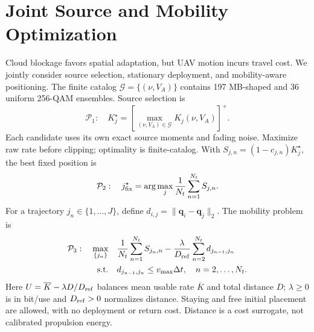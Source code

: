 \raggedbottom
\section{Joint Source and Mobility Optimization}
\label{sec:optimization}
Cloud blockage favors spatial adaptation, but UAV motion incurs travel
cost. We jointly consider source selection, stationary deployment, and
mobility-aware positioning.
The finite catalog $\mathcal G=\{(\nu,V_A)\}$ contains 197 MB-shaped and
36 uniform 256-QAM ensembles. Source selection is
\begin{equation}
 \mathcal P_1:\quad K_j^\star=
 \left[\max_{(\nu,V_A)\in\mathcal G}K_j(\nu,V_A)\right]^+.
 \label{eq:p1}
\end{equation}
Each candidate uses its own exact source moments and fading noise.
Maximize raw rate before clipping; optimality is finite-catalog.
With $S_{j,n}=(1-c_{j,n})K_j^\star$, the best fixed position is
\begin{equation}
 \mathcal P_2:\quad j_{\rm fix}^\star=
 \arg\max_j\frac{1}{N_t}\sum_{n=1}^{N_t}S_{j,n}.
 \label{eq:p2}
\end{equation}
For a trajectory $j_n\in\{1,\ldots,J\}$, define
$d_{i,j}=\|\mathbf q_i-\mathbf q_j\|_2$. The mobility problem is
\begin{align}
 \mathcal P_3:\quad\max_{\{j_n\}}\quad&
 \frac{1}{N_t}\sum_{n=1}^{N_t}S_{j_n,n}
 -\frac{\lambda}{D_{\rm ref}}\sum_{n=2}^{N_t}d_{j_{n-1},j_n}
 \label{eq:p3}\\
 \mathrm{s.t.}\quad&d_{j_{n-1},j_n}\le v_{\max}\Delta t,
                  \quad n=2,\ldots,N_t.\nonumber
\end{align}
Here $U=\overline K-\lambda D/D_{\rm ref}$ balances mean usable rate
$\overline K$ and total distance $D$; $\lambda\ge0$ is in bit/use and
$D_{\rm ref}>0$ normalizes distance. Staying and free initial placement
are allowed, with no deployment or return cost. Distance is a cost
surrogate, not calibrated propulsion energy.

